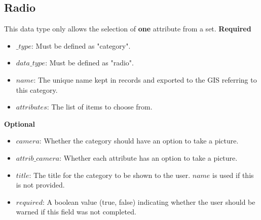 \documentclass{scrreprt}
\begin{document}
\subsection{Radio}
This data type only allows the selection of \textbf{one} attribute from a set.
\textbf{Required}
\begin{itemize}
\item $\_type$:  Must be defined as "category".
\item $data\_type$: Must be defined as "radio".
\item $name$: The unique name kept in records and exported to the GIS referring to this category.
\item $attributes$: The list of items to choose from.
\end{itemize}
\textbf{Optional}
\begin{itemize}
\item $camera$: Whether the category should have an option to take a picture.
\item $attrib\_camera$: Whether each attribute has an option to take a picture.
\item $title$: The title for the category to be shown to the user. $name$ is used if this is not provided.
\item $required$: A boolean value (true, false) indicating whether the user should be warned if this field was not completed.
\end{itemize}

\newpage
\end{document}

